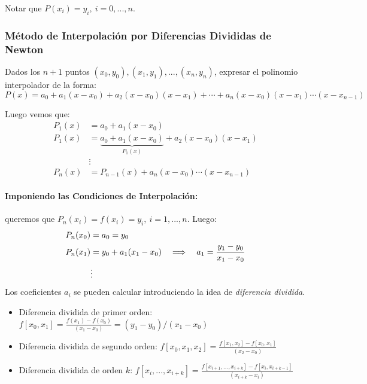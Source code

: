 Notar que \(P(x_i) = y_i,\  i=0,...,n\).

\hypertarget{muxe9todo-de-interpolaciuxf3n-por-diferencias-divididas-de-newton}{%
\subsubsection{Método de Interpolación por Diferencias Divididas de
Newton}\label{muxe9todo-de-interpolaciuxf3n-por-diferencias-divididas-de-newton}}

Dados los \(n+1\) puntos \((x_0, y_0), (x_1, y_1), ..., (x_n, y_n)\),
expresar el polinomio interpolador de la forma: \[ 
P(x) = a_0 + a_1(x-x_0) + a_2(x-x_0)(x-x_1) + \cdots +
a_n(x-x_0)(x-x_1)\cdots(x-x_{n-1})
\]

Luego vemos que: \begin{align*}
P_1(x) &= a_0 + a_1(x-x_0) \\
P_1(x) &= \underbrace{a_0 + a_1(x-x_0)}_{P_1(x)} + a_2(x-x_0)(x-x_1) \\
&\vdots \\
P_n(x) &= P_{n-1}(x) + a_n(x-x_0)\cdots(x-x_{n-1})
\end{align*}

\hypertarget{imponiendo-las-condiciones-de-interpolaciuxf3n}{%
\paragraph{Imponiendo las Condiciones de
Interpolación:}\label{imponiendo-las-condiciones-de-interpolaciuxf3n}}

queremos que \(P_n(x_i) = f(x_i) = y_i,\  i=1,...,n\). Luego:
\begin{align*}
P_n(x_0) &= a_0 = y_0 \\
P_n(x_1) &= y_0 + a_1(x_1-x_0) \quad\Longrightarrow\quad a_1 = \frac{y_1 - y_0}{x_1 - x_0} \\
&\vdots \\
\end{align*} Los coeficientes \(a_i\) se pueden calcular introduciendo
la idea de \emph{diferencia dividida}.

\begin{itemize}
\item
  Diferencia dividida de primer orden:
  \(f[x_0, x_1] = \frac{f(x_1) - f(x_0)}{(x_1 - x_0)} = (y_1 - y_0) / (x_1 - x_0)\)
\item
  Diferencia dividida de segundo orden:
  \(f[x_0, x_1, x_2] = \frac{f[x_1, x_2] - f[x_0, x_1]}{(x_2 - x_0)}\)
\item
  Diferencia dividida de orden \(k\):
  \(f[x_i,...,x_{i+k}] = \frac{f[x_{i+1},...,x_{i+k}] - f[x_i, x_{i+k-1}]}{(x_{i+k} - x_i)}\)
\end{itemize}

